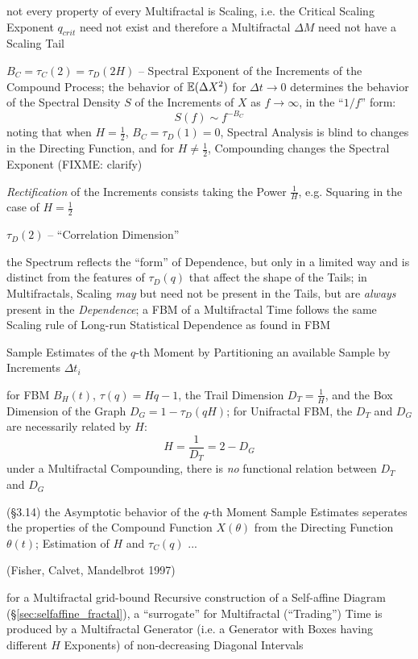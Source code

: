 not every property of every Multifractal is Scaling, i.e. the Critical Scaling
Exponent $q_{crit}$ need not exist and therefore a Multifractal $\Delta M$ need
not have a Scaling Tail

$B_C = \tau_C(2) = \tau_D(2H)$ -- Spectral Exponent of the Increments of the
Compound Process; the behavior of $\mathbb{E}(\Delta X^2)$ for $\Delta t \to 0$
determines the behavior of the Spectral Density $S$ of the Increments of $X$ as
$f \to \infty$, in the ``$1/f$'' form:
\[
  S(f) \sim f^{-B_C}
\]
noting that when $H = \frac{1}{2}$, $B_C = \tau_D(1) = 0$, Spectral Analysis is
blind to changes in the Directing Function, and for $H \neq \frac{1}{2}$,
Compounding changes the Spectral Exponent (FIXME: clarify)

\emph{Rectification} of the Increments consists taking the Power $\frac{1}{H}$,
e.g. Squaring in the case of $H = \frac{1}{2}$

$\tau_D(2)$ -- ``Correlation Dimension''

the Spectrum reflects the ``form'' of Dependence, but only in a limited way and
is distinct from the features of $\tau_D(q)$ that affect the shape of the Tails;
in Multifractals, Scaling \emph{may} but need not be present in the Tails, but
are \emph{always} present in the \emph{Dependence}; a FBM of a Multifractal Time
follows the same Scaling rule of Long-run Statistical Dependence as found in FBM

Sample Estimates of the $q$-th Moment by Partitioning an available Sample by
Increments $\Delta t_i$

for FBM $B_H(t)$, $\tau(q) = Hq - 1$, the Trail Dimension $D_T = \frac{1}{H}$,
and the Box Dimension of the Graph $D_G = 1 - \tau_D(qH)$; for Unifractal FBM,
the $D_T$ and $D_G$ are necessarily related by $H$:
\[
  H = \frac{1}{D_T} = 2 - D_G
\]
under a Multifractal Compounding, there is \emph{no} functional relation between
$D_T$ and $D_G$

(\S 3.14) the Asymptotic behavior of the $q$-th Moment Sample Estimates
seperates the properties of the Compound Function $X(\theta)$ from the Directing
Function $\theta(t)$; Estimation of $H$ and $\tau_C(q)$ ...

(Fisher, Calvet, Mandelbrot 1997)

for a Multifractal grid-bound Recursive construction of a Self-affine Diagram
(\S\ref{sec:selfaffine_fractal}), a ``surrogate'' for Multifractal (``Trading'')
Time is produced by a Multifractal Generator (i.e. a Generator with Boxes having
different $H$ Exponents) of non-decreasing Diagonal Intervals

